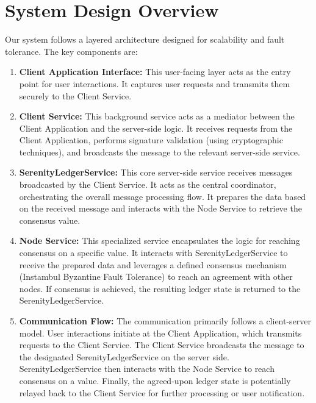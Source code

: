 \section{System Design Overview}

Our system follows a layered architecture designed for scalability and fault tolerance. The key components are:

\begin{enumerate}
    \item \textbf{Client Application Interface:} This user-facing layer acts as the entry point for user interactions. It captures user requests and transmits them securely to the Client Service. 

    \item \textbf{Client Service:} This background service acts as a mediator between the Client Application and the server-side logic. It receives requests from the Client Application, performs signature validation (using cryptographic techniques), and broadcasts the message to the relevant server-side service.  

    \item \textbf{SerenityLedgerService:} This core server-side service receives messages broadcasted by the Client Service. It acts as the central coordinator, orchestrating the overall message processing flow. It prepares the data based on the received message and interacts with the Node Service to retrieve the consensus value.

    \item \textbf{Node Service:} This specialized service encapsulates the logic for reaching consensus on a specific value. It interacts with SerenityLedgerService to receive the prepared data and leverages a defined consensus mechanism (Instambul Byzantine Fault Tolerance) to reach an agreement with other nodes. If consensus is achieved, the resulting ledger state is returned to the SerenityLedgerService.

    \item \textbf{Communication Flow:}  The communication primarily follows a client-server model. User interactions initiate at the Client Application, which transmits requests to the Client Service. The Client Service broadcasts the message to the designated SerenityLedgerService on the server side. SerenityLedgerService then interacts with the Node Service to reach consensus on a value. Finally, the agreed-upon ledger state is potentially relayed back to the Client Service for further processing or user notification.
\end{enumerate}

